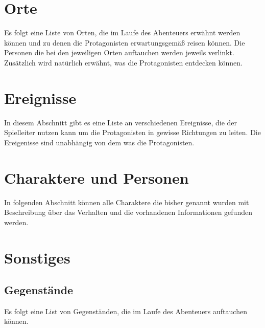 \documentclass[10pt]{article}
\begin{document}
    \tableofcontents

    \newpage
    
    \newpage
    

    \newpage
    

    \newpage
    \section{Orte}
        \label{sec:locs}
        Es folgt eine Liste von Orten, die im Laufe des Abenteuers erwähnt werden können und zu denen die Protagonisten erwartungsgemäß reisen können. Die Personen die bei den jeweiligen Orten auftauchen werden jeweils verlinkt. Zusätzlich wird natürlich erwähnt, was die Protagonisten entdecken können.
        
        
        
        

    \newpage
    \section{Ereignisse}
        \label{sec:events}
        In diesem Abschnitt gibt es eine Liste an verschiedenen Ereignisse, die der Spielleiter nutzen kann um die Protagonisten in gewisse Richtungen zu leiten. Die Ereigenisse sind unabhängig von dem was die Protagonisten.

    \newpage
    \section{Charaktere und Personen}
        In folgenden Abschnitt können alle Charaktere die bisher genannt wurden mit Beschreibung über das Verhalten und die vorhandenen Informationen gefunden werden.
    
    
    
    
    

    \newpage
    \section{Sonstiges}
        
        \subsection{Gegenstände}
            Es folgt eine List von Gegenständen, die im Laufe des Abenteuers auftauchen können.
            
            
        
\end{document}
